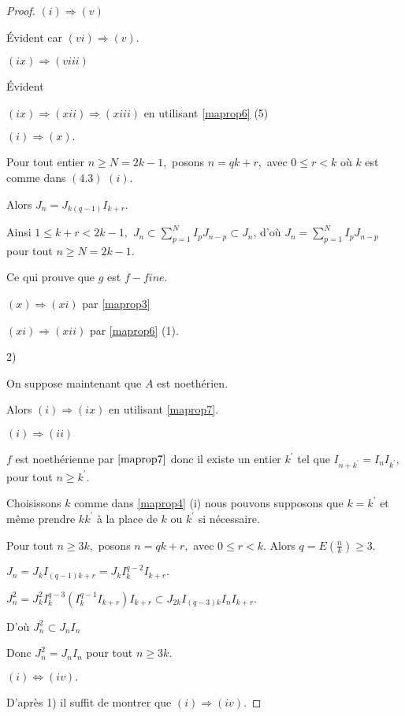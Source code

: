 \begin{proof}
	
	$(i)\Longrightarrow (v)$
	
	Évident car $(vi)\Longrightarrow (v).$
	
	$(ix)\Longrightarrow (viii)$
	
	Évident
	
	$(ix)\Longrightarrow (xii)\Longrightarrow (xiii)$ en utilisant \ref{maprop6} (5)
	
	$(i)\Longrightarrow (x).$
	
	Pour tout entier $n\geq N=2k-1,$ posons $n=qk+r,$ avec $0\leq r<k$ où $k$
	est comme dans $(4.3)$ $(i).$
	
	Alors $J_{n}=J_{k(q-1)}I_{k+r}.$
	
	Ainsi $1\leq k+r<2k-1,$ $J_{n}\subset
	\sum\limits_{p=1}^{N}I_{p}J_{n-p}\subset J_{n}$, d'où $J_{n}=\sum\limits_{p=1}^{N}I_{p}J_{n-p}$ pour tout $n\geq N=2k-1$.
	
	Ce qui prouve que $g$ est $f-fine.$
	
	$(x)\Longrightarrow (xi)$ par \ref{maprop3}
	
	$(xi)\Longrightarrow (xii)$ par \ref{maprop6} (1).
	
	
	2) 
	
	On suppose maintenant que $A$ est noethérien.
	
	Alors $(i)\Longrightarrow (ix)$ en utilisant \ref{maprop7}.
	
	$(i)\Longrightarrow (ii)$
	
	$f$ est noethérienne par $\ref{maprop7}$ donc il existe un entier $k^{\prime }$ tel que $I_{n+k^{\prime }}=I_{n}I_{k^{\prime }},$ pour tout $n\geq k^{\prime }$.
	
	Choisissons $k$ comme dans \ref{maprop4} (i) nous pouvons supposons que $k=k^{\prime }$ et même prendre $kk^{\prime }$ \`{a} la place de $k$ ou $k^{\prime }$ si nécessaire.
	
	Pour tout $n\geq 3k,$ posons $n=qk+r,$ avec $0\leq r<k.$ Alors $q=E(\frac{n}{k})\geq 3.$
	
	$J_{n}=J_{k}I_{(q-1)k+r}=J_{k}I_{k}^{q-2}I_{k+r}.$
	
	$J_{n}^{2}=J_{k}^{2}I_{k}^{q-3}(I_{k}^{q-1}I_{k+r})I_{k+r}\subset J_{2k}I_{(q-3)k}I_{n}I_{k+r}.$
	
	D'où $J_{n}^{2}\subset J_{n}I_{n}$
	
	Donc $J_{n}^{2}=J_{n}I_{n}$ pour tout $n\geq 3k.$
	
	$(i)\Longleftrightarrow (iv).$ 
	
	D'après 1) il suffit de montrer que $(i)\Longrightarrow (iv).$
	

\end{proof}
